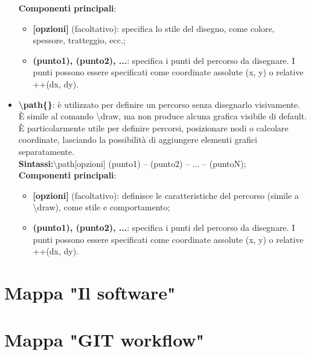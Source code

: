 \documentclass[portrait,a4paper]{article} %
\begin{document}
\begin{itemize}
    \textbf{Componenti principali}:
        \begin{itemize}
            \item \textbf{[opzioni]} (facoltativo): specifica lo stile del disegno, come colore, spessore, tratteggio, ecc.;
            \item \textbf{(punto1), (punto2), ...}: specifica i punti del percorso da disegnare. I punti possono essere specificati come coordinate assolute (x, y) o relative ++(dx, dy).
        \end{itemize}
    \item \textbf{\textbackslash path\{\}}: è utilizzato per definire un percorso senza disegnarlo visivamente. È simile al comando \textbackslash draw, ma non produce alcuna grafica visibile di default. È particolarmente utile per definire percorsi, posizionare nodi o calcolare coordinate, lasciando la possibilità di aggiungere elementi grafici separatamente.\\
    \textbf{Sintassi:}\textbackslash path[opzioni] (punto1) -- (punto2) -- ... -- (puntoN);\\
    \textbf{Componenti principali}:
        \begin{itemize}
            \item \textbf{[opzioni]} (facoltativo): definisce le caratteristiche del percorso (simile a \textbackslash draw), come stile e comportamento;
            \item \textbf{(punto1), (punto2), ...}: specifica i punti del percorso da disegnare. I punti possono essere specificati come coordinate assolute (x, y) o relative ++(dx, dy).
        \end{itemize}
\end{itemize}

\newpage
{}

\section{Mappa "Il software"}

\flushleft
\resizebox{7.2in}{!}{
        
}

\newpage
{}

\section{Mappa "GIT workflow"} 
\end{document}
